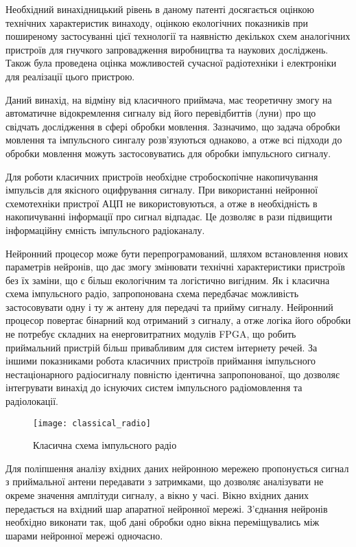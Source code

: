 Необхідний винахідницький рівень в даному патенті досягається оцінкою 
технічних характеристик винаходу, оцінкою екологічних показників при 
поширеному застосуванні цієї технології та наявністю декількох схем 
аналогічних пристроїв для гнучкого запровадження виробництва  та наукових 
досліджень. Також  була проведена оцінка можливостей сучасної радіотехніки 
і електроніки для реалізації цього пристрою.

Даний винахід, на відміну від класичного приймача, має теоретичну змогу 
на автоматичне відокремлення сигналу від його перевідбиттів (луни) про що 
свідчать дослідження в сфері обробки мовлення. Зазначимо, що задача обробки 
мовлення та імпульсного сингалу розв’язуються однаково, а отже всі підходи 
до обробки мовлення можуть застосовуватись для обробки імпульсного сигналу. 

Для роботи класичних пристроїв необхідне стробоскопічне накопичування 
імпульсів для якісного оцифрування сигналу. При використанні нейронної 
схемотехніки пристрої АЦП не використовуються, а отже в необхідність в 
накопичуванні інформації про сигнал відпадає. Це дозволяє в рази підвищити 
інформаційну ємність імпульсного радіоканалу.

Нейронний процесор може бути перепрограмований, шляхом встановлення нових
параметрів нейронів, що дає змогу змінювати технічні характеристики 
пристроїв без їх заміни, що є більш екологічним та логістично вигідним.
Як і класична схема імпульсного радіо, запропонована схема передбачає 
можливість застосовувати одну і ту ж антену для передачі та прийму сигналу. 
Нейронний процесор повертає бінарний код отриманий з сигналу, а отже логіка 
його обробки не потребує складних на енерговитратних модулів FPGA, що 
робить приймальний пристрій більш привабливим для систем інтернету речей. 
За іншими показниками робота класичних пристроїв приймання імпульсного нестаціонарного радіосигналу повністю ідентична запропонованої, що 
дозволяє інтегрувати винахід до існуючих систем імпульсного 
радіомовлення та радіолокації.

\begin{figure}[htbp] \begin{center}
\texttt{[image: classical\_radio]}
\caption{Класична схема імпульсного радіо} \label{fig:emp_radio}
\end{center} \end{figure}

Для поліпшення аналізу вхідних даних нейронною мережею пропонується 
сигнал з приймальної антени передавати з затримками, що дозволяє 
аналізувати не окреме значення амплітуди сигналу, а вікно у часі. 
Вікно вхідних даних передається на вхідний шар апаратної нейронної мережі. 
З'єднання нейронів необхідно виконати так, щоб дані обробки одно вікна 
переміщувались між шарами нейронної мережі одночасно. 

